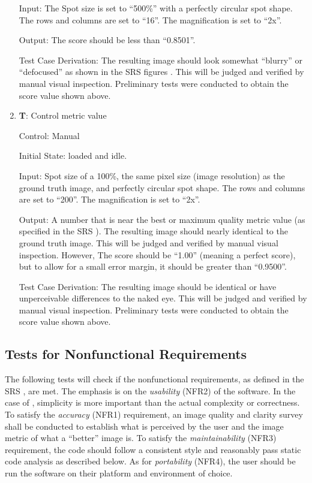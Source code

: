 \documentclass[12pt, titlepage]{article}
\newcounter{testnum} %
\begin{document}
\begin{enumerate}
  Input: The Spot size is set to ``500\%'' with a perfectly circular spot shape.
    The rows and columns are set to ``16''.
    The magnification is set to ``2x''.
            
  Output: The score should be less than ``0.8501''.

  Test Case Derivation: The resulting image should look somewhat ``blurry'' or ``defocused''
    as shown in the SRS figures \citep{SRS}.
    This will be judged and verified by manual visual inspection.
    Preliminary tests were conducted to obtain the score value shown above.

  \item{\textbf{T\thetestnum \label{T_manualMetricControl}}: Control metric value\\}

  Control: Manual
              
  Initial State: \progname{} loaded and idle.
            
  Input: Spot size of a 100\%, the same pixel size (image resolution) as the ground truth image, 
    and perfectly circular spot shape.
    The rows and columns are set to ``200''.
    The magnification is set to ``2x''.
            
  Output: A number that is near the best or maximum quality metric value
    (as specified in the SRS \cite{SRS}). The resulting image should nearly
    identical to the ground truth image. This will be judged and verified by manual visual inspection.
    However, The score should be ``1.00'' (meaning a perfect score), but to allow
    for a small error margin, it should be greater than ``0.9500''.

  Test Case Derivation: The resulting image should be identical or have unperceivable differences to the naked eye.
    This will be judged and verified by manual visual inspection.
    Preliminary tests were conducted to obtain the score value shown above.

\end{enumerate}


\subsection{Tests for Nonfunctional Requirements} \label{sec_NFR_tests}

The following tests will check if the nonfunctional requirements, as defined in the SRS \citep{SRS}, are 
met. The emphasis is on the \textit{usability} (NFR2) of the software. In the case of \progname{}, 
simplicity is more important than the actual complexity or correctness.
To satisfy the \textit{accuracy} (NFR1) requirement, an image quality and clarity survey shall be
conducted to establish what is perceived by the user and the image metric of what 
a ``better'' image is. To satisfy the \textit{maintainability} (NFR3) requirement, the code should 
follow a consistent style and reasonably pass static code analysis as described below.
As for \textit{portability} (NFR4), the user should be run the software on their platform and 
environment of choice.
\end{document}
